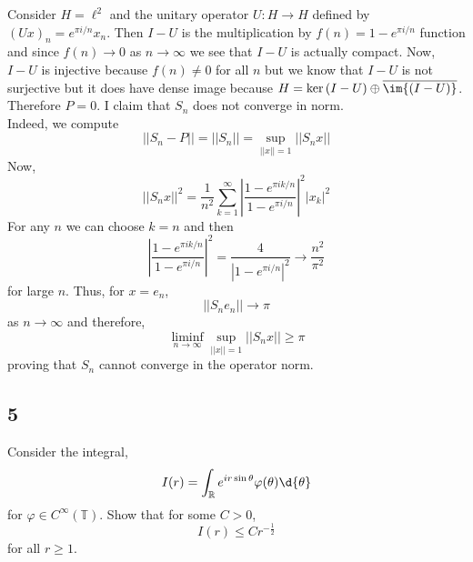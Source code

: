 \documentclass[12pt]{article}
\newcommand{\R}{\mathbb{R}}
\renewcommand{\T}{\mathbb{T}}
\begin{document}
Consider $H = \ell^2$ and the unitary operator $U : H \to H$ defined by $(U x)_n = e^{\pi i / n} x_n$. Then $I - U$ is the multiplication by $f(n) = 1 - e^{\pi i / n}$ function and since $f(n) \to 0$ as $n \to \infty$ we see that $I - U$ is actually compact. Now, $I - U$ is injective because $f(n) \neq 0$ for all $n$ but we know that $I - U$ is not surjective but it does have dense image because $H = \ker{(I - U)} \oplus \overline{\im{(I - U)}}$. Therefore $P = 0$. I claim that $S_n$ does not converge in norm.
\bigskip\\
Indeed, we compute
\[ || S_n - P || = || S_n || = \sup_{|| x || = 1} || S_n x || \]
Now,
\[ || S_n x ||^2 = \frac{1}{n^2} \sum_{k = 1}^\infty \left| \frac{1 - e^{\pi i k / n}}{1 - e^{\pi i/n}} \right|^2 |x_k|^2 \]
For any $n$ we can choose $k = n$ and then 
\[ \left| \frac{1 - e^{\pi i k / n}}{1 - e^{\pi i/n}} \right|^2 = \frac{4}{| 1 -e^{\pi i /n} |^2} \to \frac{n^2}{\pi^2} \]
for large $n$. Thus, for $x = e_n$,
\[ || S_n e_n || \to \pi \]
as $n \to \infty$ and therefore,
\[ \liminf_{n \to \infty} \sup_{|| x || = 1} || S_n x || \ge \pi \]
proving that $S_n$ cannot converge in the operator norm.


\subsection{5}

\begin{exercise}
Consider the integral,
\[ I(r) = \int_\R e^{i r  \sin{\theta}} \varphi(\theta) \d{\theta} \]
for $\varphi \in C^{\infty}(\T)$. 
Show that for some $C > 0$,
\[ I(r) \le C r^{-\frac{1}{2}} \]
for all $r \ge 1$.
\end{exercise}
\end{document}
